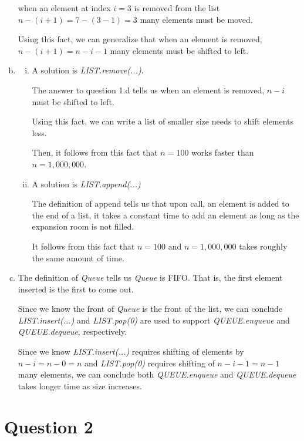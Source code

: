 \documentclass[12pt]{article}
\begin{document}
\begin{enumerate}[a.]
\begin{mdframed}
        when an element at index $i = 3$ is removed from the list $n - (i+1) =
        7 - (3 - 1) = 3$ many elements must be moved.

        \bigskip

        Using this fact, we can generalize that when an element is removed,
        $n - (i+1) = n - i - 1$ many elements must be shifted to left.

        \color{black}

    \end{mdframed}

    \item

    \begin{enumerate}[i.]
        \item

        A solution is \textit{LIST.remove(...)}.

        \bigskip

        The answer to question 1.d tells us when an element is removed, $n-i$
        must be shifted to left.

        \bigskip

        Using this fact, we can write a list of smaller size needs to shift elements less.

        \bigskip

        Then, it follows from this fact that $n = 100$ works faster than $n = 1,000,000$.

        \item

        A solution is \textit{LIST.append(...)}

        \bigskip

        The definition of append tells us that upon call, an element is added to
        the end of a list, it takes a constant time to add an element
        as long as the expansion room is not filled.

        \bigskip

        It follows from this fact that $n = 100$ and $n = 1,000,000$ takes roughly
        the same amount of time.
    \end{enumerate}

    \item

    The definition of \textit{Queue} tells us \textit{Queue} is FIFO. That is,
    the first element inserted is the first to come out.

    \bigskip

    Since we know the front of \textit{Queue} is the front of the list, we
    can conclude \textit{LIST.insert(...)} and \textit{LIST.pop(0)} are used
    to support \textit{QUEUE.enqueue} and \textit{QUEUE.dequeue}, respectively.

    \bigskip

    Since we know \textit{LIST.insert(...)} requires shifting of elements by $n - i = n - 0 = n$
    and \textit{LIST.pop(0)} requires shifting of $n - i - 1 = n - 1$ many elements,
    we can conclude both \textit{QUEUE.enqueue} and \textit{QUEUE.dequeue} takes
    longer time as size increases.

\end{enumerate}

\section*{Question 2 }
\end{document}
